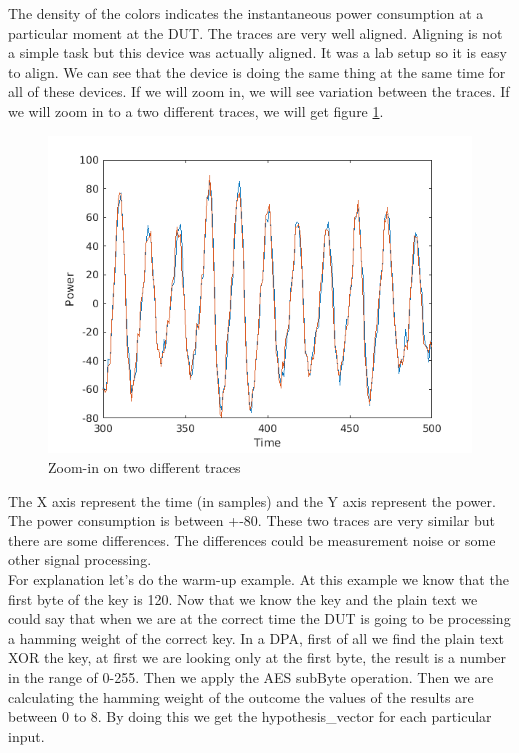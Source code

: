 The density of the colors indicates the instantaneous power consumption at a
particular moment at the DUT. The traces are very well aligned. Aligning is not
a simple task but this device was actually aligned. It was a lab setup so it is
easy to align. We can see that the device is doing the same thing at the same
time for all of these devices. If we will zoom in, we will see variation between
the traces. If we will zoom in to a two different traces, we will get figure
\ref{c8_Matlab_zoomin_on_two_traces:fig}.
\begin{figure}[!ht]
    \centering
    \includegraphics[width=1.0\textwidth]{images/chapter8/TwoSamples.png}
    \caption{Zoom-in on two different traces} \label{c8_Matlab_zoomin_on_two_traces:fig}
\end{figure}
The X axis represent the time (in samples) and the Y axis represent the power.
The power consumption is between +-80. These two traces are very similar but
there are some differences. The differences could be measurement noise or some
other signal processing.\\
For explanation let's do the warm-up example. At this example we know that the
first byte of the key is 120. Now that we know the key and the plain text we
could say that when we are at the correct time the DUT is going to be processing
a hamming weight of the correct key. In a DPA, first of all we find the plain
text XOR the key, at first we are looking only at the first byte, the result is
a number in the range of 0-255. Then we apply the AES subByte operation. Then we
are calculating the hamming weight of the outcome the values of the results are
between 0 to 8. By doing this we get the hypothesis\_vector for each particular
input.

